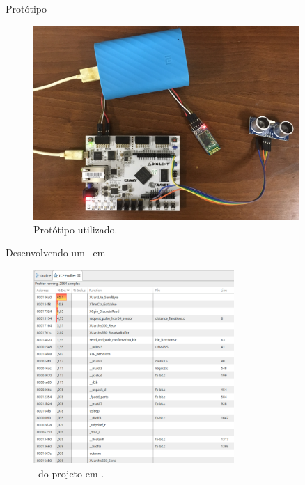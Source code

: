 \begin{frame}{Protótipo}
\vspace{-0.8em}
\begin{figure}[h] \centering
    \includegraphics[width=0.9\textwidth]{img/placa.jpg}
    \vspace{-1em}
    \caption{Protótipo utilizado.}
\end{figure}
\end{frame}

\begin{frame}{Desenvolvendo um \Wearable\ em \Software }
\vspace{-0.8em}
\begin{figure}[h] \centering
    \includegraphics[width=0.68\textwidth]{img/tcf_software.png}
    \vspace{-1em}
    \caption{\Profile\ do projeto em \software .}
\end{figure}
\end{frame}


